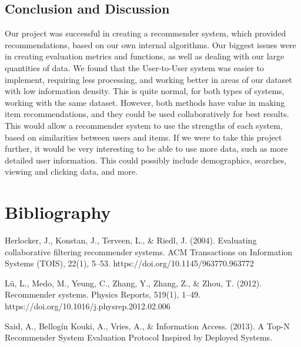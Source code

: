 \documentclass[11pt]{article}
\begin{document}
	\subsection{Conclusion and Discussion}
	Our project was successful in creating a recommender system, which provided recommendations, based on our own internal algorithms. Our biggest issues were in creating evaluation metrics and functions, as well as dealing with our large quantities of data. We found that the User-to-User system was easier to implement, requiring less processing, and working better in areas of our dataset with low information density. This is quite normal, for both types of systems, working with the same dataset. However, both methods have value in making item recommendations, and they could be used collaboratively for best results. This would allow a recommender system to use the strengths of each system, based on similarities between users and items. If we were to take this project further, it would be very interesting to be able to use more data, such as more detailed user information. This could possibly include demographics, searches, viewing and clicking data, and more.
	
	
	\section{Bibliography}
	Herlocker, J., Konstan, J., Terveen, L., & Riedl, J. (2004). Evaluating collaborative filtering recommender systems. ACM Transactions on Information Systems (TOIS), 22(1), 5–53. https://doi.org/10.1145/963770.963772
	
	Lü, L., Medo, M., Yeung, C., Zhang, Y., Zhang, Z., & Zhou, T. (2012). Recommender systems. Physics Reports, 519(1), 1–49. https://doi.org/10.1016/j.physrep.2012.02.006
	
	Said, A., Bellogín Kouki, A., Vries, A., & Information Access. (2013). A Top-N Recommender System Evaluation Protocol Inspired by Deployed Systems.
	
\end{document}
